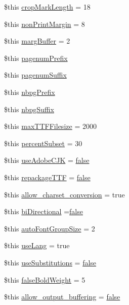 \begin{DoxyCompactItemize}
\$this \hyperlink{config_8php_a803fbf7b4e58e1aef2abf357fcdb2d30}{crop\-Mark\-Length} = 18
\item 
\$this \hyperlink{config_8php_a5bd2c4e34e5ffc2760a58482f8e6ecc9}{non\-Print\-Margin} = 8
\item 
\$this \hyperlink{config_8php_ac9dde0481ec6586daada0c4703f10540}{marg\-Buffer} = 2
\item 
\$this \hyperlink{config_8php_a9ad846e229cda78da8815c4af186fd74}{pagenum\-Prefix}
\item 
\$this \hyperlink{config_8php_a608af622aef738884ad70e15c445c694}{pagenum\-Suffix}
\item 
\$this \hyperlink{config_8php_a5d0a0b5b9133bbb6e297644fdabb44b5}{nbpg\-Prefix}
\item 
\$this \hyperlink{config_8php_a15acdcf27eae956e16b855d034e85778}{nbpg\-Suffix}
\item 
\$this \hyperlink{config_8php_a6cdbd21236605c9a7584dd5ec3fcc8bd}{max\-T\-T\-F\-Filesize} = 2000
\item 
\$this \hyperlink{config_8php_a467058bbbf9bdf611a12b1f3f174a8a5}{percent\-Subset} = 30
\item 
\$this \hyperlink{config_8php_ad0b49b3b058f257114a2cd364408978a}{use\-Adobe\-C\-J\-K} = \hyperlink{ttfontsuni_8php_afbaa04e5cc97693dc668b3c45d3dd740}{false}
\item 
\$this \hyperlink{config_8php_af82c58187010cd8f4c902cb10fa99a90}{repackage\-T\-T\-F} = \hyperlink{ttfontsuni_8php_afbaa04e5cc97693dc668b3c45d3dd740}{false}
\item 
\$this \hyperlink{config_8php_acf49acd024290d78ee8b94459a4ae703}{allow\-\_\-charset\-\_\-conversion} = true
\item 
\$this \hyperlink{config_8php_a9f8ab3f48236828bac556e27bd1fcb99}{bi\-Directional} =\hyperlink{ttfontsuni_8php_afbaa04e5cc97693dc668b3c45d3dd740}{false}
\item 
\$this \hyperlink{config_8php_aca0ab44e957d771fe1126cb55d31ce80}{auto\-Font\-Group\-Size} = 2
\item 
\$this \hyperlink{config_8php_aac01eebb872feca7e3ecd9e9c043d73e}{use\-Lang} = true
\item 
\$this \hyperlink{config_8php_ab6d71e6e0c904739db868eada5928c81}{use\-Substitutions} = \hyperlink{ttfontsuni_8php_afbaa04e5cc97693dc668b3c45d3dd740}{false}
\item 
\$this \hyperlink{config_8php_ab8ee0c261b128b4ebd36f9a9635f37dc}{false\-Bold\-Weight} = 5
\item 
\$this \hyperlink{config_8php_a06a3a32a809fb752defc67c71c2e3f3d}{allow\-\_\-output\-\_\-buffering} = \hyperlink{ttfontsuni_8php_afbaa04e5cc97693dc668b3c45d3dd740}{false}

\end{DoxyCompactItemize}
